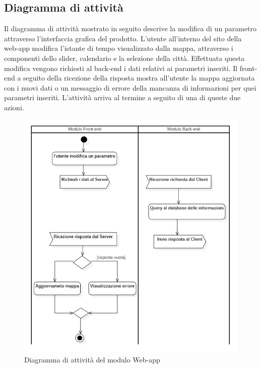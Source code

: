 \subsection{Diagramma di attività}\label{ArchitetturaModuloWebAppDiagrammaDiAttività}
Il diagramma di attività mostrato in seguito descrive la modifica di un parametro attraverso l'interfaccia grafica del prodotto. L'utente all'interno del sito della web-app modifica l'istante di tempo visualizzato dalla mappa, attraverso i componenti dello slider, calendario e la selezione della città. Effettuata questa modifica vengono richiesti al back-end i dati relativi ai parametri inseriti. Il front-end a seguito della ricezione della risposta mostra all'utente la mappa aggiornata con i nuovi dati o un messaggio di errore della mancanza di informazioni per quei parametri inseriti. L'attività arriva al termine a seguito di una di queste due azioni.
\begin{figure}[H]
  \begin{center}
    \includegraphics[scale=0.8]{../immagini/diag_PB/diag_act_front_back.png}
    \caption{Diagramma di attività del modulo Web-app}
  \end{center}
\end{figure}
